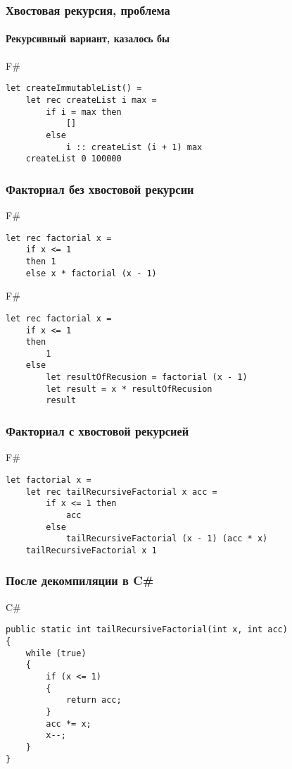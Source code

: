 \documentclass[xetex,mathserif,serif]{beamer}
\begin{document}
	\begin{frame}[fragile]
		\frametitle{Хвостовая рекурсия, проблема}
		\framesubtitle{Рекурсивный вариант, казалось бы}
		\begin{exampleblock}{F\#}
			\begin{verbatim}
let createImmutableList() =
    let rec createList i max =
        if i = max then
            []	
        else
            i :: createList (i + 1) max
    createList 0 100000
			\end{verbatim}
		\end{exampleblock}
\end{frame}

	\begin{frame}[fragile]
		\frametitle{Факториал без хвостовой рекурсии}
		\begin{exampleblock}{F\#}
			\begin{verbatim}
let rec factorial x =
    if x <= 1
    then 1 
    else x * factorial (x - 1)
			\end{verbatim}
		\end{exampleblock}

		\begin{exampleblock}{F\#}
			\begin{verbatim}
let rec factorial x =
    if x <= 1
    then
        1
    else
        let resultOfRecusion = factorial (x - 1)
        let result = x * resultOfRecusion
        result
			\end{verbatim}
		\end{exampleblock}
\end{frame}

	\begin{frame}[fragile]
		\frametitle{Факториал с хвостовой рекурсией}
		\begin{exampleblock}{F\#}
			\begin{verbatim}
let factorial x =
    let rec tailRecursiveFactorial x acc =
        if x <= 1 then
            acc
        else
            tailRecursiveFactorial (x - 1) (acc * x)
    tailRecursiveFactorial x 1
			\end{verbatim}
		\end{exampleblock}
\end{frame}
	
	\begin{frame}[fragile]
		\frametitle{После декомпиляции в C\#}
		\begin{alertblock}{C\#}
			\begin{verbatim}
public static int tailRecursiveFactorial(int x, int acc)
{
    while (true)
    {
        if (x <= 1)
        {
            return acc;
        }
        acc *= x;
        x--;
    }
}
			\end{verbatim}
		\end{alertblock}
\end{frame}
\end{document}
